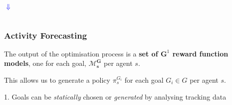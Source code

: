 \begin{frame}
\begin{columns}[T]
		\vspace{0.3cm}
		
	\end{columns}
	
	\begin{columns}[T]
		\column{\textwidth}
		
		\centering
		\vspace{-3.1cm}
		\hspace{-1cm}
		\Huge
		\begin{rotate}{-45}
			
			\textcolor{blue}{\textbf{$ \Downarrow $}}
		\end{rotate}	
	\end{columns}
\end{frame}

\begin{frame}
	\frametitle{Activity Forecasting}
	
	\Large
	
	\vspace{1.2cm}
	
	The output of the optimisation process is a \textbf{set of $ \mathbf{G}^1 $ reward
	function models}, one for each goal, $ \mathbf{\mathcal{M}_s^G} $ per agent $ s $. \\
	
	\vspace{0.4cm}
	
	This allows us to generate a policy $ \pi_s^{G_i} $ for each goal $ G_i \in G $ per
	agent $ s $. \\
	
	\vspace{2cm}
	
	\normalsize
	
	1. Goals can be \emph{statically} chosen or \emph{generated} by analysing tracking data
\end{frame}

